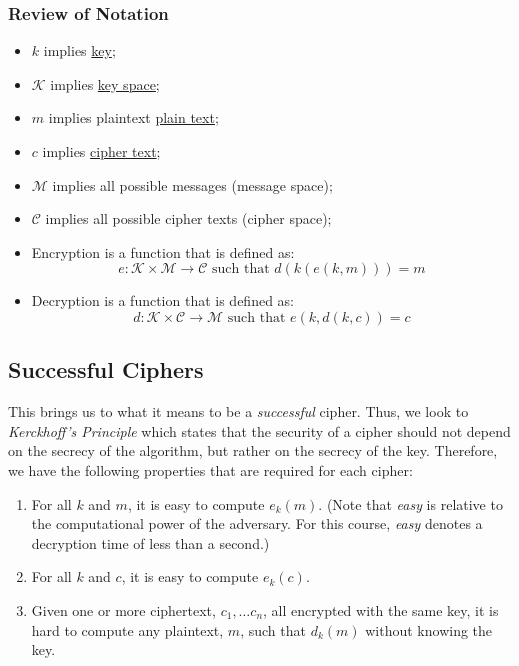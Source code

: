 \begin{center}
    \subsubsection{Review of Notation}
\end{center}

\begin{itemize}
    \item \(k\) implies \hyperlink{Key}{key};
    \item \(\mathcal{K}\) implies \hyperlink{Key Space}{key space};
    \item \(m\) implies plaintext \hyperlink{Plain Text}{plain text};
    \item \(c\) implies \hyperlink{Cipher Text}{cipher text};
    \item \(\mathcal{M}\) implies all possible messages (message space);
    \item \(\mathcal{C}\) implies all possible cipher texts (cipher space);
    \item Encryption is a function that is defined as: \[e: \mathcal{K} \times \mathcal{M} \rightarrow \mathcal{C} \text{ such that } d(k(e(k,m))) = m\]
    \item Decryption is a function that is defined as: \[d: \mathcal{K} \times \mathcal{C} \rightarrow \mathcal{M} \text{ such that } e(k,d(k,c)) = c\]
\end{itemize}
\hypertarget{Successful Ciphers}{}
\subsection{Successful Ciphers}

This brings us to what it means to be a \textit{successful} cipher. Thus, we look to \textit{Kerckhoff's Principle} which states that the security of a cipher should not depend on the secrecy of the algorithm, but rather on the secrecy of the key. Therefore, we have the following properties that are required for each cipher:
\begin{enumerate}[label=\arabic*.]
    \item For all \(k\) and \(m\), it is easy to compute \(e_k(m)\). (Note that \textit{easy} is relative to the computational power of the adversary. For this course, \textit{easy} denotes a decryption time of less than a second.)
    \item For all \(k\) and \(c\), it is easy to compute \(e_k(c)\).
    \item Given one or more ciphertext, \(c_1,\dots c_n\), all encrypted with the same key, it is hard to compute any plaintext, \(m\), such that \(d_k(m)\) without knowing the key.
\end{enumerate}

